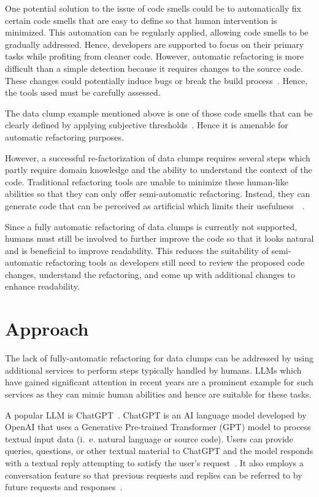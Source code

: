 One potential solution to the issue of code smells could be to automatically fix certain code smells that are easy to define so that human intervention is minimized. This automation can be regularly applied, allowing code smells to be gradually addressed. Hence, developers are supported  to focus on their primary tasks while profiting from cleaner code. 
However,  automatic refactoring  is more difficult than a simple detection because it requires changes to the source code. These changes could potentially induce bugs or break the build process~\cite{9796303}. Hence, the tools used must be carefully assessed. 

The data clump example mentioned above is one of those code smells that can be clearly defined by applying subjective thresholds~\cite{zhangImprovingPrecisionFowler2008}. Hence it is amenable for automatic refactoring purposes. 


However, a successful re-factorization of data clumps requires several steps which partly require domain knowledge and the ability to understand the context of the code. Traditional refactoring tools are unable to minimize these human-like abilities so that they can only offer semi-automatic refactoring.   Instead, they can generate code that can be  perceived as artificial which limits their usefulness~\cite{pomian2024furtherllmsidestatic}~\cite{4145023}. 

Since a fully automatic refactoring of data clumps is currently not supported, humans must still be involved to further improve the code so that it looks natural and is beneficial to improve readability. This reduces the suitability of semi-automatic refactoring tools as developers still need to review the proposed code changes, understand the refactoring, and come up with additional changes to enhance readability. 



\section{Approach}

The lack of fully-automatic refactoring for data clumps can be addressed by using additional 
  services to perform steps typically handled by humans.  \acp{LLM} which have gained significant attention in recent years are a prominent example for such services as they can mimic human abilities and hence are suitable for these tasks.
  
  A popular \ac{LLM} is ChatGPT~\cite{ChatGPT_url}. ChatGPT is an AI language model developed by OpenAI that uses a Generative Pre-trained Transformer (GPT) model to process textual input data (i.~e. natural language or source code). Users can provide queries, questions, or other textual material to ChatGPT and the model responds with a textual reply attempting to satisfy the user's request~\cite{yetistirenEvaluatingCodeQuality2023}. It also employs a conversation feature so that previous requests and replies can be referred to by future requests and responses~\cite{10189263}.

